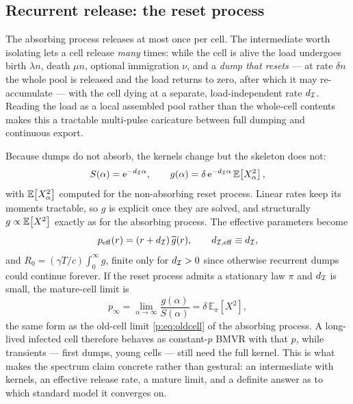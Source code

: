 \subsection{Recurrent release: the reset process}
\label{p:sec:reset}

The absorbing process releases at most once per cell. The intermediate worth
isolating lets a cell release \emph{many} times: while the cell is alive the
load undergoes birth $\lambda n$, death $\mu n$, optional immigration $\nu$,
and a \emph{dump that resets} --- at rate $\delta n$ the whole pool is
released and the load returns to zero, after which it may re-accumulate ---
with the cell dying at a separate, load-independent rate $d_{\mathcal{I}}$.
Reading the load as a local assembled pool rather than the whole-cell
contents makes this a tractable multi-pulse caricature between full dumping
and continuous export.

Because dumps do not absorb, the kernels change but the skeleton does not:
\begin{equation}
S(\alpha)=\mathrm{e}^{-d_{\mathcal{I}}\alpha},
\qquad
g(\alpha)=\delta\,\mathrm{e}^{-d_{\mathcal{I}}\alpha}\,\mathbb{E}\!\left[X_\alpha^2\right],
\label{p:eq:reset-kernels}
\end{equation}
with $\mathbb{E}\!\left[X_\alpha^2\right]$ computed for the non-absorbing reset process. Linear
rates keep its moments tractable, so $g$ is explicit once they are solved,
and structurally $g\propto\mathbb{E}\!\left[X^2\right]$ exactly as for the absorbing process.
The effective parameters become
\begin{equation}
p_{\rm eff}(r)=\left(r+d_{\mathcal{I}}\right)\widetilde{g}(r),
\qquad
d_{\mathcal{I},{\rm eff}}\equiv d_{\mathcal{I}},
\label{p:eq:reset-peff}
\end{equation}
and $R_0=(\gamma T/c)\int_0^\infty g$, finite only for $d_{\mathcal{I}}>0$ since
otherwise recurrent dumps could continue forever. If the reset process
admits a stationary law $\pi$ and $d_{\mathcal{I}}$ is small, the mature-cell
limit is
\begin{equation}
p_\infty=\lim_{\alpha\to\infty}\frac{g(\alpha)}{S(\alpha)}
=\delta\,\mathbb{E}_\pi[X^2],
\label{p:eq:reset-mature}
\end{equation}
the same form as the old-cell limit \cref{p:eq:oldcell} of the absorbing
process. A long-lived infected cell therefore behaves as constant-$p$ BMVR
with that $p$, while transients --- first dumps, young cells --- still need
the full kernel. This is what makes the spectrum claim concrete rather than
gestural: an intermediate with kernels, an effective release rate, a mature
limit, and a definite answer as to which standard model it converges on.

